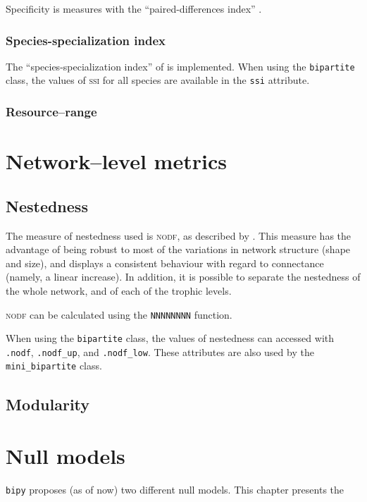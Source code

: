 \documentclass[10pt]{scrbook}
\begin{document}
Specificity is measures with the ``paired-differences index'' \citep[\textsc{pdi},][]{PoisotBL2011,PoisotPRSLB2011}. 

\subsection{Species-specialization index}

The ``species-specialization index'' of \citet{Julliard2006} is implemented. When using the  \texttt{bipartite} class, the values of \textsc{ssi} for all species are available in the \texttt{ssi} attribute.

\subsection{Resource--range}


\chapter{Network--level metrics}

\section{Nestedness}

The measure of nestedness used is \textsc{nodf}, as described by \citet{Almeida-Neto2008}. This measure has the advantage of being robust to most of the variations in network structure (shape and size), and displays a consistent behaviour with regard to connectance (namely, a linear increase). In addition, it is possible to separate the nestedness of the whole network, and of each of the trophic levels.

\textsc{nodf} can be calculated using the \texttt{NNNNNNNN} function.

When using the \texttt{bipartite} class, the values of nestedness can accessed with \texttt{.nodf}, \texttt{.nodf\_up}, and \texttt{.nodf\_low}. These attributes are also used by the \texttt{mini\_bipartite} class.

\section{Modularity}

\chapter{Null models}

\texttt{bipy} proposes (as of now) two different null models. This chapter presents the
\end{document}
